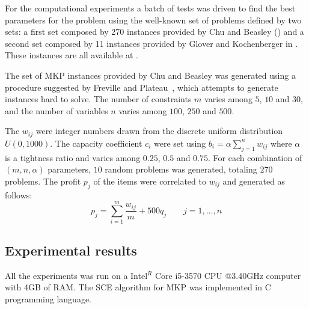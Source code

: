For the computational experiments a batch of tests was driven to find the best
parameters for the problem using the well-known set of problems defined by two sets:
a first set composed by 270 instances provided by Chu and Beasley (\cite{Chu-Beasley-1998})
and a second set composed by 11 instances provided by Glover and Kochenberger in
\cite{glover1996critical}.
These instances are all available at \cite{ORLibrary}.

The set of MKP instances provided by Chu and Beasley was generated using a
procedure suggested by Freville and Plateau~\cite{freville1994efficient}, which
attempts to generate instances hard to solve.
The number of constraints $m$ varies among $5$, $10$ and $30$, and the number
of variables $n$ varies among $100$, $250$ and $500$.

The $w_{ij}$ were integer numbers drawn from the discrete uniform distribution
$U(0, 1000)$.
The capacity coefficient $c_i$ were set using
$b_i = \alpha\sum_{j=1}^{n} w_{ij}$ where $\alpha$ is a tightness ratio and
varies among $0.25$, $0.5$ and $0.75$.
For each combination of $(m,n,\alpha)$ parameters, $10$ random problems was generated,
totaling $270$ problems.
The profit $p_j$ of the items were correlated to $w_{ij}$ and generated as follows:
\begin{displaymath}
  p_j = \sum_{i=1}^m \frac{w_{ij}}{m} + 500q_j \qquad j = 1, \ldots, n
\end{displaymath}



\subsection{Experimental results}

All the experiments was run on a Intel$^R$ Core i5-3570 CPU @3.40GHz computer
with 4GB of RAM.
The SCE algorithm for MKP was implemented in C programming language.

